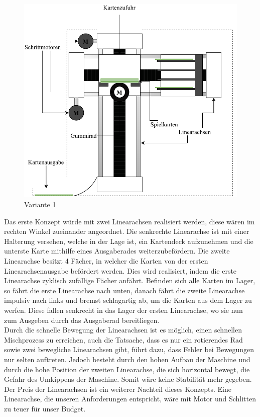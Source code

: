 \begin{figure}[hb]
    \centering
    \includegraphics[scale=0.9,page=1]{fig/mech/Version1}
    \caption{Variante 1}

\end{figure}

\pagebreak
Das erste Konzept würde mit zwei Linearachsen realisiert werden, diese wären im rechten Winkel zueinander
angeordnet. Die senkrechte Linearachse ist mit einer Halterung versehen, welche in der Lage ist,
ein Kartendeck aufzunehmen und die unterste Karte mithilfe eines Ausgaberades weiterzubefördern. Die zweite
Linearachse besitzt 4 Fächer, in welcher die Karten von der ersten Linearachsenausgabe befördert werden.
Dies wird realisiert, indem die erste Linearachse zyklisch zufällige Fächer anfährt. Befinden sich alle Karten im Lager, so fährt die erste Linearachse nach unten, danach
fährt die zweite Linearachse impulsiv nach links und bremst schlagartig ab, um die Karten aus dem Lager zu werfen. Diese fallen
senkrecht in das Lager der ersten Linearachse, wo sie nun zum Ausgeben durch das Ausgaberad bereitliegen. \\



Durch die schnelle Bewegung der Linearachsen ist es möglich, einen schnellen Mischprozess zu erreichen,
auch die Tatsache, dass es nur ein rotierendes Rad sowie zwei bewegliche Linearachsen gibt, führt dazu, dass
Fehler bei Bewegungen nur selten auftreten. Jedoch besteht durch den hohen Aufbau der Maschine und durch die hohe
Position der zweiten Linearachse, die sich horizontal bewegt, die Gefahr des Umkippens der Maschine. Somit wäre
keine Stabilität mehr gegeben. Der Preis der Linearachsen ist ein weiterer Nachteil dieses Konzepts. Eine Linearachse,
die unseren Anforderungen entspricht, wäre mit Motor und Schlitten zu teuer für unser Budget. \\

